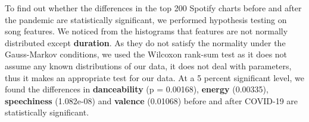 \documentclass[landscape,a0paper,fontscale=0.34]{baposter}
\begin{document}
\begin{poster}
{\vspace{0.3cm}
To find out whether the differences in the top 200 Spotify charts before and after the pandemic are statistically significant, we performed hypothesis testing on song features. We noticed from the histograms that features are not normally distributed except \textbf{duration}. As they do not satisfy the normality under the Gauss-Markov conditions, we used the Wilcoxon rank-sum test as it does not assume any known distributions of our data, it does not deal with parameters, thus it makes an appropriate test for our data. At a 5 percent significant level, we found the differences in \textbf{danceability} (p = 0.00168), \textbf{energy} (0.00335), \textbf{speechiness} (1.082e-08) and \textbf{valence} (0.01068) before and after COVID-19 are statistically significant.
}



\end{poster}
\end{document}
